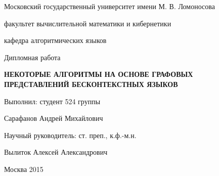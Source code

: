 \thispagestyle{empty}
\begin{center}
{
    \large
    Московский государственный университет имени М. В. Ломоносова\par
    факультет вычислительной математики и кибернетики\par
    кафедра алгоритмических языков\par
}
\par
\end{center}

\vspace{20mm}
\begin{flushright}

{\sl}%
\end{flushright}

\begin{center}
%


\vspace{30mm}
Дипломная работа

\vspace{5mm}
{
    \bf \large
    НЕКОТОРЫЕ АЛГОРИТМЫ НА ОСНОВЕ ГРАФОВЫХ ПРЕДСТАВЛЕНИЙ БЕСКОНТЕКСТНЫХ ЯЗЫКОВ
    \par
}

\end{center}

\vspace{20mm}
\begin{flushright}
Выполнил: студент 524 группы

Сарафанов Андрей Михайлович

\vspace{10mm}
Научный руководитель: ст. преп., к.ф.-м.н.

Вылиток Алексей Александрович
\end{flushright}

\vspace{20mm}
\begin{center}
{Москва 2015}
\end{center}

\newpage
